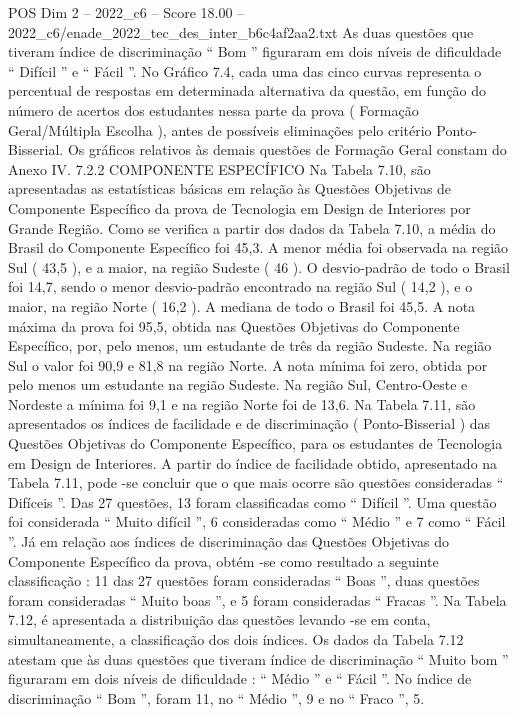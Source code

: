 \begin{textsample}{POS Dim 2 – 2022\_c6 – Score 18.00 – 2022\_c6/enade\_2022\_tec\_des\_inter\_b6c4af2aa2.txt}
As duas questões que tiveram índice de discriminação “ Bom ” figuraram em dois níveis de dificuldade “ Difícil ” e “ Fácil ”.
No Gráfico 7.4, cada uma das cinco curvas representa o percentual de respostas em determinada alternativa da questão, em função do número de acertos dos estudantes nessa parte da prova ( Formação Geral/Múltipla Escolha ), antes de possíveis eliminações pelo critério Ponto-Bisserial.
Os gráficos relativos às demais questões de Formação Geral constam do Anexo IV. 7.2.2 COMPONENTE ESPECÍFICO Na Tabela 7.10, são apresentadas as estatísticas básicas em relação às Questões Objetivas de Componente Específico da prova de Tecnologia em Design de Interiores por Grande Região.
Como se verifica a partir dos dados da Tabela 7.10, a média do Brasil do Componente Específico foi 45,3.
A menor média foi observada na região Sul ( 43,5 ), e a maior, na região Sudeste ( 46 ).
O desvio-padrão de todo o Brasil foi 14,7, sendo o menor desvio-padrão encontrado na região Sul ( 14,2 ), e o maior, na região Norte ( 16,2 ).
A mediana de todo o Brasil foi 45,5.
A nota máxima da prova foi 95,5, obtida nas Questões Objetivas do Componente Específico, por, pelo menos, um estudante de três da região Sudeste.
Na região Sul o valor foi 90,9 e 81,8 na região Norte.
A nota mínima foi zero, obtida por pelo menos um estudante na região Sudeste.
Na região Sul, Centro-Oeste e Nordeste a mínima foi 9,1 e na região Norte foi de 13,6.
Na Tabela 7.11, são apresentados os índices de facilidade e de discriminação ( Ponto-Bisserial ) das Questões Objetivas do Componente Específico, para os estudantes de Tecnologia em Design de Interiores.
A partir do índice de facilidade obtido, apresentado na Tabela 7.11, pode -se concluir que o que mais ocorre são questões consideradas “ Difíceis ”.
Das 27 questões, 13 foram classificadas como “ Difícil ”.
Uma questão foi considerada “ Muito difícil ”, 6 consideradas como “ Médio ” e 7 como “ Fácil ”.
Já em relação aos índices de discriminação das Questões Objetivas do Componente Específico da prova, obtém -se como resultado a seguinte classificação : 11 das 27 questões foram consideradas “ Boas ”, duas questões foram consideradas “ Muito boas ”, e 5 foram consideradas “ Fracas ”.
Na Tabela 7.12, é apresentada a distribuição das questões levando -se em conta, simultaneamente, a classificação dos dois índices.
Os dados da Tabela 7.12 atestam que às duas questões que tiveram índice de discriminação “ Muito bom ” figuraram em dois níveis de dificuldade : “ Médio ” e “ Fácil ”.
No índice de discriminação “ Bom ”, foram 11, no “ Médio ”, 9 e no “ Fraco ”, 5.

\end{textsample}
